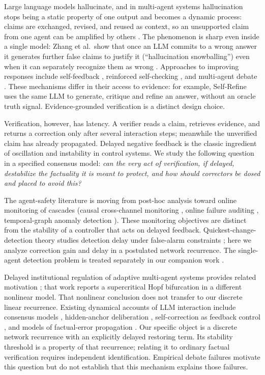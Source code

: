\documentclass[11pt]{article}
\theoremstyle{definition}
\begin{document}
Large language models hallucinate, and in multi-agent systems hallucination stops being a static
property of one output and becomes a dynamic process: claims are exchanged, revised, and
reused as context, so an unsupported claim from one agent can be amplified by others
\cite{HallCascade,SparkFire,Collective}. The phenomenon is sharp even inside a single model:
Zhang et al.\ show that once an LLM commits to a wrong answer it generates further false claims to
justify it (``hallucination snowballing'') even when it can separately recognize them as wrong
\cite{Snowball}. Approaches to improving responses include self-feedback
\cite{SelfRefine}, reinforced self-checking \cite{MARCH}, and multi-agent debate
\cite{Du,ReConcile}. These mechanisms differ in their access to evidence: for example,
Self-Refine uses the same LLM to generate, critique and refine an answer, without an oracle
truth signal. Evidence-grounded verification is a distinct design choice.

Verification, however, has latency. A verifier reads a claim, retrieves evidence, and returns a
correction only after several interaction steps; meanwhile the unverified claim has already
propagated. Delayed negative feedback is the classic ingredient of oscillation and instability in
control systems. We study the following question in a specified consensus model: \emph{can the
very act of verification, if delayed, destabilize the factuality it is meant to protect, and how
should correctors be dosed and placed to avoid this?}

The agent-safety literature is moving from post-hoc analysis toward online monitoring of
cascades (causal cross-channel monitoring \cite{CASPIAN}, online failure auditing
\cite{AgentForesight}, temporal-graph anomaly detection \cite{GUARDIAN}). These monitoring objectives
are distinct from the stability of a controller that acts on delayed feedback. Quickest-change-detection
theory studies detection delay under false-alarm constraints \cite{Page,Lorden,Pollak,VeeraBanerjee};
here we analyze correction gain and delay in a postulated network recurrence. The single-agent
detection problem is treated separately in our companion work \cite{ItkinQCD}.

Delayed institutional regulation of adaptive multi-agent systems provides related motivation
\cite{Itkin2026}; that work reports a supercritical Hopf bifurcation in a different nonlinear
model. That nonlinear conclusion does not transfer to our discrete linear recurrence.
Existing dynamical accounts of LLM interaction include
consensus models \cite{OpinionConsensus,ChenConsensus}, hidden-anchor deliberation
\cite{HiddenAnchors}, self-correction as feedback control \cite{SelfCorrFeedback}, and models of
factual-error propagation \cite{HallCascade,Collective,SparkFire}. Our specific object is a discrete
network recurrence with an explicitly delayed restoring term. Its stability threshold is a property
of that recurrence; relating it to ordinary factual verification requires independent identification.
Empirical debate failures \cite{DebateCollapse} motivate this question but do not establish that
this mechanism explains those failures.
\end{document}
